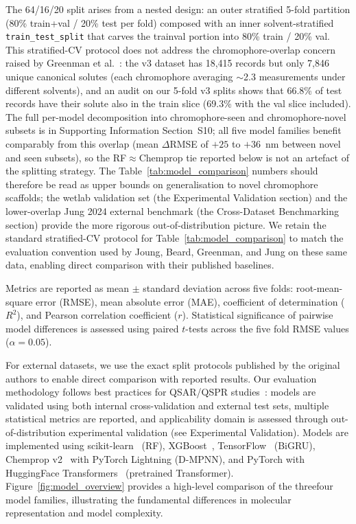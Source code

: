 \documentclass[journal=jcisd8,manuscript=article]{achemso}
\newcommand{\added}[1]{{\color{addedblue}#1}}
\newcommand{\removed}[1]{{\color{removedred}#1}}
\begin{document}
\added{The 64/16/20 split arises from a nested design: an outer stratified 5-fold partition (80\% train+val / 20\% test per fold) composed with an inner solvent-stratified \texttt{train\_test\_split} that carves the trainval portion into 80\% train / 20\% val. This stratified-CV protocol does not address the chromophore-overlap concern raised by Greenman et al.~\cite{greenman2022multifidelity}: the v3 dataset has 18{,}415 records but only 7{,}846 unique canonical solutes (each chromophore averaging $\sim$2.3 measurements under different solvents), and an audit on our 5-fold v3 splits shows that 66.8\% of test records have their solute also in the train slice (69.3\% with the val slice included). The full per-model decomposition into chromophore-seen and chromophore-novel subsets is in Supporting Information Section~S10; all five model families benefit comparably from this overlap (mean $\Delta$RMSE of $+25$ to $+36$~nm between novel and seen subsets), so the RF$\approx$Chemprop tie reported below is not an artefact of the splitting strategy. The Table~\ref{tab:model_comparison} numbers should therefore be read as upper bounds on generalisation to novel chromophore scaffolds; the wetlab validation set (the Experimental Validation section) and the lower-overlap Jung 2024 external benchmark (the Cross-Dataset Benchmarking section) provide the more rigorous out-of-distribution picture. We retain the standard stratified-CV protocol for Table~\ref{tab:model_comparison} to match the evaluation convention used by Joung, Beard, Greenman, and Jung on these same data, enabling direct comparison with their published baselines.}

Metrics are reported as mean $\pm$ standard deviation across five folds: root-mean-square error (RMSE), mean absolute error (MAE), coefficient of determination ($R^2$), and Pearson correlation coefficient ($r$).
Statistical significance of pairwise model differences is assessed using paired $t$-tests across the five fold RMSE values ($\alpha = 0.05$).

For external datasets, we use the exact split protocols published by the original authors to enable direct comparison with reported results.
Our evaluation methodology follows best practices for QSAR/QSPR studies~\cite{tropsha2006best, cherkasov2014qsar}: models are validated using both internal cross-validation and external test sets, multiple statistical metrics are reported, and applicability domain is assessed through out-of-distribution experimental validation (see Experimental Validation).
Models are implemented using scikit-learn~\cite{pedregosa2011scikit} (RF), XGBoost~\cite{chen2016xgboost}, TensorFlow~\cite{abadi2016tensorflow} (BiGRU), Chemprop v2~\cite{yangAnalyzingLearnedMolecular2019} with PyTorch Lightning (D-MPNN), and PyTorch with HuggingFace Transformers~\cite{chithrananda2020chemberta} (pretrained Transformer).
Figure~\ref{fig:model_overview} provides a high-level comparison of the \removed{three}\added{four} model families, illustrating the fundamental differences in molecular representation and model complexity.
\end{document}
